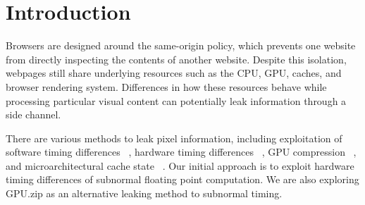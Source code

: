 \section{Introduction}
\label{sec:introduction}

Browsers are designed around the same-origin policy, which
prevents one website from directly inspecting the contents
of another website. Despite this isolation, webpages still
share underlying resources such as the CPU, GPU, caches,
and browser rendering system. Differences in how these
resources behave while processing particular visual content
can potentially leak information through a side channel.

There are various methods to leak pixel information, including exploitation of software timing differences ~\cite{stone2013pixel}, hardware timing differences ~\cite{andrysco2015subnormal}, GPU compression ~\cite{wang2024gpuzip}, and microarchitectural cache state ~\cite{oconnell2024pixelthief}. Our initial approach is to exploit hardware timing differences of subnormal floating point computation. We are also exploring GPU.zip as an alternative leaking method to subnormal timing.